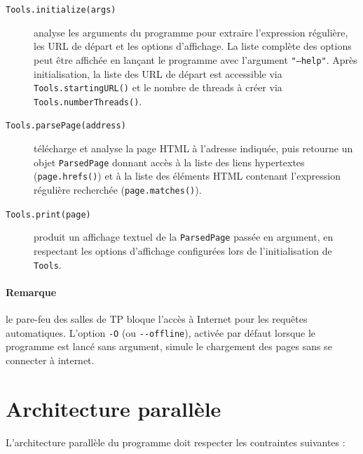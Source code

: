 \begin{description}
\item[\texttt{Tools.initialize(args)}] analyse les arguments du programme pour extraire l'expression régulière, les URL de départ et les options d'affichage.  
  La liste complète des options peut être affichée en lançant le programme avec l'argument \texttt{"--help"}.  
  Après initialisation, la liste des URL de départ est accessible via \texttt{Tools.startingURL()}  
  et le nombre de threads à créer via \texttt{Tools.numberThreads()}.
  
\item[\texttt{Tools.parsePage(address)}] télécharge et analyse la page HTML à l'adresse indiquée,  
  puis retourne un objet \texttt{ParsedPage} donnant accès à la liste des liens hypertextes  
  (\texttt{page.hrefs()}) et à la liste des éléments HTML contenant l'expression régulière recherchée  
  (\texttt{page.matches()}).

\item[\texttt{Tools.print(page)}] produit un affichage textuel de la \texttt{ParsedPage} passée en argument,
  en respectant les options d'affichage configurées lors de l'initialisation de \texttt{Tools}.
\end{description}

\paragraph{Remarque} le pare-feu des salles de TP bloque l'accès à Internet pour les requêtes automatiques.
L'option \lstinline{-O} (ou \lstinline{--offline}), activée par défaut lorsque le programme est lancé sans argument,
simule le chargement des pages sans se connecter à internet.

\pagebreak
\section{Architecture parallèle}

L'architecture parallèle du programme doit respecter les contraintes suivantes :

